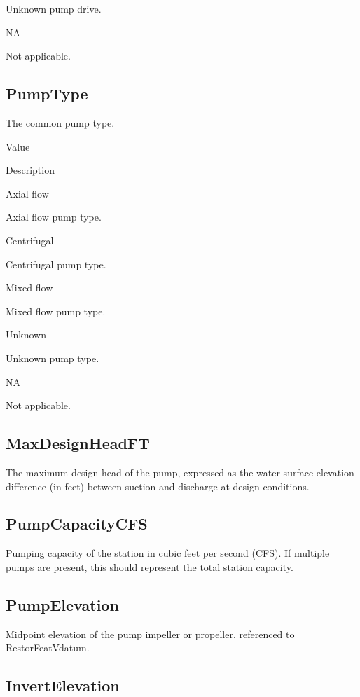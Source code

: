 \documentclass[
  letterpaper,
  DIV=11,
  numbers=noendperiod]{scrreprt}
\begin{document}
Unknown pump drive.

NA

Not applicable.

\subsection{PumpType}\label{pumptype-1}

The common pump type.

Value

Description

Axial flow

Axial flow pump type.

Centrifugal

Centrifugal pump type.

Mixed flow

Mixed flow pump type.

Unknown

Unknown pump type.

NA

Not applicable.

\subsection{MaxDesignHeadFT}\label{maxdesignheadft-1}

The maximum design head of the pump, expressed as the water surface
elevation difference (in feet) between suction and discharge at design
conditions.

\subsection{PumpCapacityCFS}\label{pumpcapacitycfs-1}

Pumping capacity of the station in cubic feet per second (CFS). If
multiple pumps are present, this should represent the total station
capacity.

\subsection{PumpElevation}\label{pumpelevation-1}

Midpoint elevation of the pump impeller or propeller, referenced to
RestorFeatVdatum.

\subsection{InvertElevation}\label{invertelevation-1}
\end{document}
